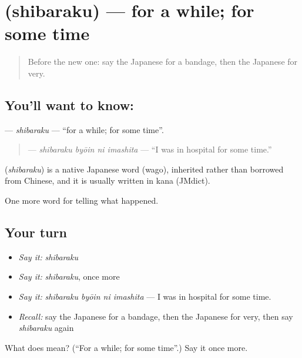 \section[\texorpdfstring{\ja{しばらく} (shibaraku)}{しばらく (shibaraku)}]{ (shibaraku) — for a while; for some time}

\label{lesson:JA-C264-shibaraku}



\begin{quote}
Before the new one: say the Japanese for a bandage, then the Japanese for very.
\end{quote}

\subsection*{You'll want to know: }
\textbf{} — \emph{shibaraku} — \textquotedblleft{}for a while; for some time\textquotedblright{}.

\begin{quote}
\textbf{  } — \emph{shibaraku byōin ni imashita} — \textquotedblleft{}I was in hospital for some time.\textquotedblright{}
\end{quote}

\begin{cousinweb}
\textbf{} (\emph{shibaraku}) is a native Japanese word (wago), inherited rather than borrowed from Chinese, and it is usually written in kana (JMdict).
\end{cousinweb}

\begin{grammarlens}[title={What you've built}]
One more word for telling what happened.
\end{grammarlens}

\subsection*{Your turn}
\begin{itemize}
\raggedright
  \item \emph{Say it:} \emph{shibaraku}
  \item \emph{Say it:} \emph{shibaraku}, once more
  \item \emph{Say it:} \emph{shibaraku byōin ni imashita} — I was in hospital for some time.
  \item \emph{Recall:} say the Japanese for a bandage, then the Japanese for very, then say \emph{shibaraku} again
\end{itemize}

\begin{tcolorbox}[breakable,colback=teal!4,colframe=teal!35!black,title={Before you move on}]
What does  mean? (\textquotedblleft{}For a while; for some time\textquotedblright{}.) Say it once more.
\end{tcolorbox}
